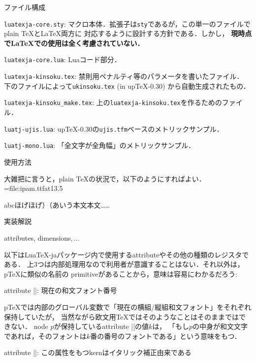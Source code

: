 \beginparagraph ファイル構成


\item {\tt luatexja-core.sty}: 
マクロ本体．拡張子は{\tt sty}であるが，この単一のファイルでplain \TeX と\LaTeX 両方に
対応するように設計する方針である．しかし，
{\bf 現時点で\LaTeX での使用は全く考慮されていない．}
\item {\tt luatexja-core.lua}: Luaコード部分．
\item {\tt luatexja-kinsoku.tex}: 禁則用ペナルティ等のパラメータを書いたファイル．
下のファイルによって{\tt ukinsoku.tex} (in up\TeX-0.30) から自動生成されたもの．
\item {\tt luatexja-kinsoku\_make.tex}: 上の{\tt luatexja-kinsoku.tex}を作るためのファイル．
\item {\tt luatj-ujis.lua}: up\TeX-0.30の{\tt ujis.tfm}ベースのメトリックサンプル．
\item {\tt luatj-mono.lua}: 「全文字が全角幅」のメトリックサンプル．
\enditem

\beginsection 使用方法

大雑把に言うと，plain \TeX の状況で，以下のようにすればよい．
\begintt
\font\tenipam={file:ipam.ttf}at13.5\jQ 
\jfont{}                     %
\tenipam{}\zw 
{}                 %

\rm abcほげほげ）（あいう本文本文……
\endtt

\beginsection 実装解説

\beginparagraph attributes, dimensions,$\,\ldots$

以下はLua\TeX-jaパッケージ内で使用するattributeやその他の種類のレジスタである．
上3つは内部処理用なので利用者が意識することはない．それ以外は，p\TeX に類似の名前の
primitiveがあることから，意味は容易にわかるだろう:

\item attribute |\luatexja@curjfn|: 現在の和文フォント番号

p\TeX では内部のグローバル変数で「現在の横組/縦組和文フォント」をそれぞれ保持していたが，
当然ながら欧文用\TeX ではそのようなことはそのままではできない．
node $p$が保持しているattribute |\luatexja@curjfn|の値$k$は，
「もし$p$の中身が和文文字であれば，そのフォントは$k$番の番号のフォントである」という意味をもつ．

\item attribute |\luatexja@icflag|: この属性をもつkernはイタリック補正由来である

